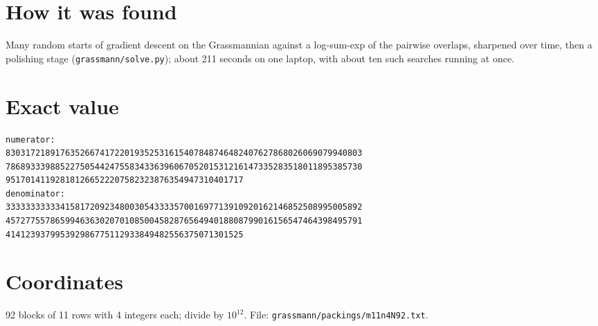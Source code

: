 \documentclass[11pt,a4paper]{article}
\begin{document}
\section{How it was found}
Many random starts of gradient descent on the Grassmannian against a log-sum-exp of the pairwise overlaps, sharpened over time, then a polishing stage (\texttt{grassmann/solve.py}); about 211 seconds on one laptop, with about ten such searches running at once.


\appendix
\section{Exact value}
{\small
\begin{verbatim}
numerator:
830317218917635266741722019352531615407848746482407627868026069079940803
786893339885227505442475583433639606705201531216147335283518011895385730
951701411928181266522207582323876354947310401717
denominator:
333333333334158172092348003054333357001697713910920162146852508995005892
457277557865994636302070108500458287656494018808799016156547464398495791
414123937995392986775112933849482556375071301525
\end{verbatim}}

\section{Coordinates}
92 blocks of 11 rows with 4 integers each; divide by $10^{12}$. File: \texttt{grassmann/packings/m11n4N92.txt}.
{\tiny
\begin{multicols}{3}
\end{multicols}}
\end{document}
